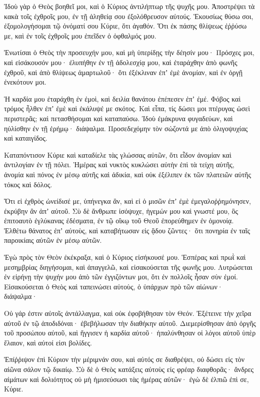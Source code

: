 \begin{spacing}{1.1}
\begin{multicols}{2}
Ἰδοὺ γὰρ ὁ Θεὸς βοηθεῖ μοι, καὶ ὁ Κύριος ἀντιλήπτωρ τῆς ψυχῆς μου.
Ἀποστρέψει τὰ κακὰ τοῖς ἐχθροῖς μου, ἐν τῇ ἀληθείᾳ σου ἐξολόθρευσον αὐτούς.
Ἑκουσίως θύσω σοι, ἐξομολογήσομαι τῷ ὀνόματί σου Κύριε, ὅτι ἀγαθόν.
Ὅτι ἐκ πάσης θλίψεως ἐῤῥύσω με, καὶ ἐν τοῖς ἐχθροῖς μου ἐπεῖδεν ὁ ὀφθαλμός μου.

Ἐνωτίσαι ὁ Θεὸς τὴν προσευχήν μου, καὶ μὴ ὑπερίδῃς τὴν δέησίν μου·
Πρόσχες μοι, καὶ εἰσάκουσόν μου· ἐλυπήθην ἐν τῇ ἀδολεσχίᾳ μου, καὶ ἐταράχθην
ἀπὸ φωνῆς ἐχθροῦ, καὶ ἀπὸ θλίψεως ἁμαρτωλοῦ· ὅτι ἐξέκλιναν ἐπʼ ἐμὲ ἀνομίαν, καὶ ἐν ὀργῇ ἐνεκότουν μοι.

Ἡ καρδία μου ἐταράχθη ἐν ἐμοὶ, καὶ δειλία θανάτου ἐπέπεσεν ἐπʼ ἐμέ.
Φόβος καὶ τρόμος ἦλθεν ἐπʼ ἐμὲ καὶ ἐκάλυψέ με σκότος.
Καὶ εἶπα, τίς δώσει μοι πτέρυγας ὡσεὶ περιστερᾶς; καὶ πετασθήσομαι καὶ καταπαύσω.
Ἰδοὺ ἐμάκρυνα φυγαδεύων, καὶ ηὐλίσθην ἐν τῇ ἐρήμῳ· διάψαλμα.
Προσεδεχόμην τὸν σώζοντά με ἀπὸ ὀλιγοψυχίας καὶ καταιγίδος.

Καταπόντισον Κύριε καὶ καταδίελε τὰς γλώσσας αὐτῶν, ὅτι εἶδον ἀνομίαν καὶ ἀντιλογίαν ἐν τῇ πόλει.
Ἡμέρας καὶ νυκτὸς κυκλώσει αὐτὴν ἐπὶ τὰ τείχη αὐτῆς, ἀνομία καὶ πόνος ἐν μέσῳ αὐτῆς
καὶ ἀδικία, καὶ οὐκ ἐξέλιπεν ἐκ τῶν πλατειῶν αὐτῆς τόκος καὶ δόλος.

Ὅτι εἰ ἐχθρὸς ὠνείδισέ με, ὑπήνεγκα ἂν, καὶ εἰ ὁ μισῶν ἐπʼ ἐμὲ ἐμεγαλοῤῥημόνησεν, ἐκρύβην ἂν ἀπʼ αὐτοῦ.
Σὺ δὲ ἄνθρωπε ἰσόψυχε, ἡγεμών μου καὶ γνωστέ μου,
ὃς ἐπιτοαυτὸ ἐγλύκανας ἐδέσματα, ἐν τῷ οἴκῳ τοῦ Θεοῦ ἐπορεύθημεν ἐν ὁμονοίᾳ.
Ἐλθέτω θάνατος ἐπʼ αὐτοὺς, καὶ καταβήτωσαν εἰς ᾅδου ζῶντες· ὅτι πονηρία ἐν ταῖς παροικίαις αὐτῶν ἐν μέσῳ αὐτῶν.

Ἐγὼ πρὸς τὸν Θεὸν ἐκέκραξα, καὶ ὁ Κύριος εἰσήκουσέ μου.
Ἑσπέρας καὶ πρωῒ καὶ μεσημβρίας διηγήσομαι, καὶ ἀπαγγελῶ, καὶ εἰσακούσεται τῆς φωνῆς μου.
Λυτρώσεται ἐν εἰρήνῃ τὴν ψυχήν μου ἀπὸ τῶν ἐγγιζόντων μοι, ὅτι ἐν πολλοῖς ἦσαν σὺν ἐμοί.
Εἰσακούσεται ὁ Θεὸς καὶ ταπεινώσει αὐτοὺς, ὁ ὑπάρχων πρὸ τῶν αἰώνων· διάψαλμα·

Οὐ γάρ ἐστιν αὐτοῖς ἀντάλλαγμα, καὶ οὐκ ἐφοβήθησαν τὸν Θεόν. Ἐξέτεινε τὴν χεῖρα αὐτοῦ ἐν τῷ ἀποδιδόναι· ἐβεβήλωσαν τὴν διαθήκην αὐτοῦ.
Διεμερίσθησαν ἀπὸ ὀργῆς τοῦ προσώπου αὐτοῦ, καὶ ἤγγισεν ἡ καρδία αὐτοῦ· ἡπαλύνθησαν οἱ λόγοι αὐτοῦ ὑπὲρ ἔλαιον, καὶ αὐτοί εἰσι βολίδες.

Ἐπίῤῥιψον ἐπὶ Κύριον τὴν μέριμνάν σου, καὶ αὐτός σε διαθρέψει, οὐ δώσει εἰς τὸν αἰῶνα σάλον τῷ δικαίῳ.
Σὺ δὲ ὁ Θεὸς κατάξεις αὐτοὺς εἰς φρέαρ διαφθορᾶς· ἄνδρες αἱμάτων καὶ δολιότητος οὐ μὴ ἡμισεύσωσι τὰς ἡμέρας αὐτῶν· ἐγὼ δὲ ἐλπιῶ ἐπὶ σε, Κύριε.


\end{multicols}
\end{spacing}
